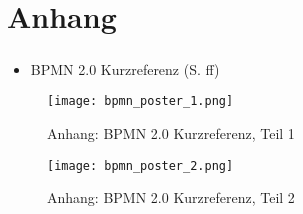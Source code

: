 \chapter*{Anhang}

\paragraph{}

\begin{itemize}
	\item BPMN 2.0 Kurzreferenz (S. \pageref{anhang:bpmn-kurzreferenz} ff)

\end{itemize}

\pagebreak
{}

\begin{figure}[H]
 	\centering
	\texttt{[image: bpmn\_poster\_1.png]}
 	\caption{Anhang: BPMN 2.0 Kurzreferenz, Teil 1}
 	\label{anhang:bpmn-kurzreferenz}
\end{figure}

\pagebreak

\begin{figure}[H]
 	\centering
	\texttt{[image: bpmn\_poster\_2.png]}
 	\caption{Anhang: BPMN 2.0 Kurzreferenz, Teil 2}
\end{figure}

